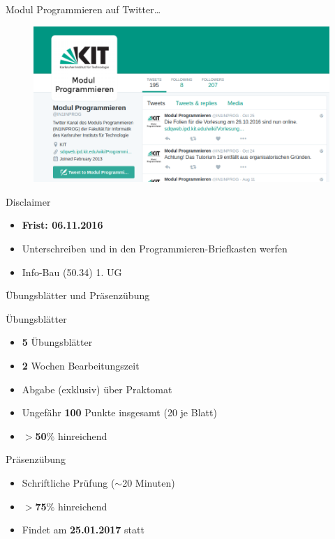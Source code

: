 \documentclass[18pt]{beamer}
\begin{document}
\begin{frame}{Modul Programmieren auf Twitter\dots}
    \begin{figure}
        \includegraphics[scale=.4]{img/modulprogtwitter.png}
    \end{figure}
\end{frame}

\begin{frame}{Disclaimer}
    \begin{itemize}
        \item \textbf{Frist: \alert{06.11.2016}}
        \item Unterschreiben und in den Programmieren-Briefkasten werfen
        \item Info-Bau (50.34) 1. UG
    \end{itemize}
\end{frame}

\begin{frame}{Übungsblätter und Präsenzübung}
    \begin{block}{Übungsblätter}
        \begin{itemize}
            \item \textbf{5} Übungsblätter
            \item \textbf{2} Wochen Bearbeitungszeit
            \item Abgabe (exklusiv) über Praktomat
            \item Ungefähr \textbf{100} Punkte insgesamt (20 je Blatt)
            \item $>$\textbf{50}$\%$ hinreichend
        \end{itemize}
    \end{block}

    \pause

    \begin{block}{Präsenzübung}
        \begin{itemize}
            \item Schriftliche Prüfung ($\sim$20 Minuten)
            \item $>$\textbf{75}$\%$ hinreichend
            \item Findet am \textbf{25.01.2017} statt
        \end{itemize}
    \end{block}


\end{frame}
\end{document}
